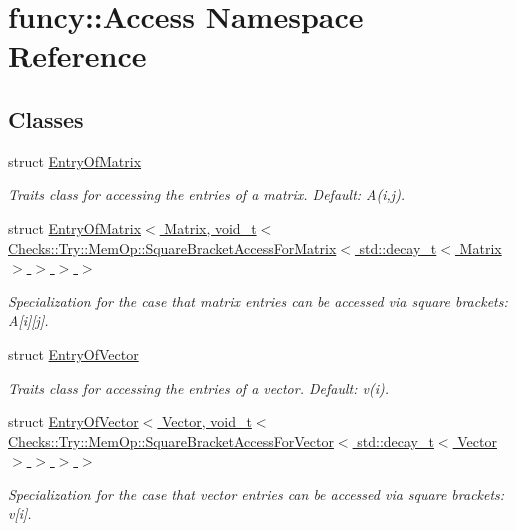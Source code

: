 \hypertarget{namespacefuncy_1_1Access}{\section{funcy\-:\-:Access Namespace Reference}
\label{namespacefuncy_1_1Access}
}
\subsection*{Classes}
\begin{DoxyCompactItemize}
\item 
struct \hyperlink{structfuncy_1_1Access_1_1EntryOfMatrix}{Entry\-Of\-Matrix}
\begin{DoxyCompactList}\small\item\em Traits class for accessing the entries of a matrix. Default\-: A(i,j). \end{DoxyCompactList}\item 
struct \hyperlink{structfuncy_1_1Access_1_1EntryOfMatrix_3_01Matrix_00_01void__t_3_01Checks_1_1Try_1_1MemOp_1_1Squ7a075b4fa54d007e4cf9d29dbba38820}{Entry\-Of\-Matrix$<$ Matrix, void\-\_\-t$<$ Checks\-::\-Try\-::\-Mem\-Op\-::\-Square\-Bracket\-Access\-For\-Matrix$<$ std\-::decay\-\_\-t$<$ Matrix $>$ $>$ $>$ $>$}
\begin{DoxyCompactList}\small\item\em Specialization for the case that matrix entries can be accessed via square brackets\-: A\mbox{[}i\mbox{]}\mbox{[}j\mbox{]}. \end{DoxyCompactList}\item 
struct \hyperlink{structfuncy_1_1Access_1_1EntryOfVector}{Entry\-Of\-Vector}
\begin{DoxyCompactList}\small\item\em Traits class for accessing the entries of a vector. Default\-: v(i). \end{DoxyCompactList}\item 
struct \hyperlink{structfuncy_1_1Access_1_1EntryOfVector_3_01Vector_00_01void__t_3_01Checks_1_1Try_1_1MemOp_1_1Squ5cd836559cca83db378509772a83f5e4}{Entry\-Of\-Vector$<$ Vector, void\-\_\-t$<$ Checks\-::\-Try\-::\-Mem\-Op\-::\-Square\-Bracket\-Access\-For\-Vector$<$ std\-::decay\-\_\-t$<$ Vector $>$ $>$ $>$ $>$}
\begin{DoxyCompactList}\small\item\em Specialization for the case that vector entries can be accessed via square brackets\-: v\mbox{[}i\mbox{]}. \end{DoxyCompactList}\end{DoxyCompactItemize}
